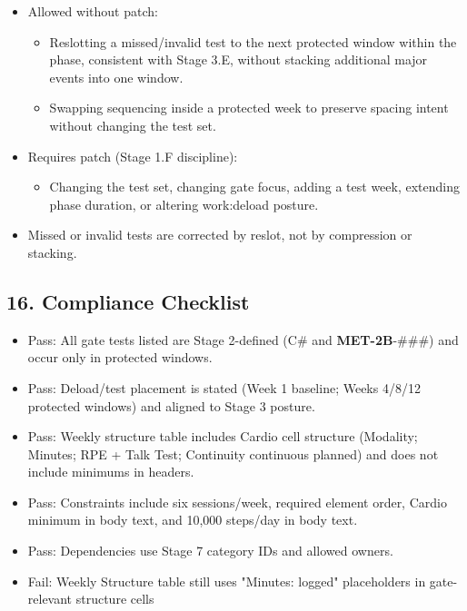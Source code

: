 \documentclass[10pt]{article}
\begin{document}
\begin{itemize}
\item Allowed without patch:
  \begin{itemize}
  \item Reslotting a missed/invalid test to the next protected window within the phase, consistent with Stage 3.E, without stacking additional major events into one window.
  \item Swapping sequencing inside a protected week to preserve spacing intent without changing the test set.
  \end{itemize}
\item Requires patch (Stage 1.F discipline):
  \begin{itemize}
  \item Changing the test set, changing gate focus, adding a test week, extending phase duration, or altering work:deload posture.
  \end{itemize}
\item Missed or invalid tests are corrected by reslot, not by compression or stacking.
\end{itemize}

\subsection*{16. Compliance Checklist}

\begin{itemize}
\item Pass: All gate tests listed are Stage 2-defined (C\# and \textbf{MET-2B}-\#\#\#) and occur only in protected windows.
\item Pass: Deload/test placement is stated (Week 1 baseline; Weeks 4/8/12 protected windows) and aligned to Stage 3 posture.
\item Pass: Weekly structure table includes Cardio cell structure (Modality; Minutes; RPE + Talk Test; Continuity continuous planned) and does not include minimums in headers.
\item Pass: Constraints include six sessions/week, required element order, Cardio minimum in body text, and 10,000 steps/day in body text.
\item Pass: Dependencies use Stage 7 category IDs and allowed owners.
\item Fail: Weekly Structure table still uses "Minutes: logged" placeholders in gate-relevant structure cells
\end{itemize}
\end{document}

